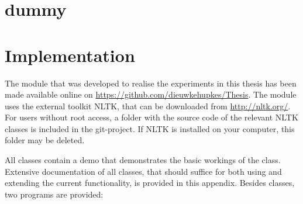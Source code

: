 \documentclass[]{report}
\begin{document}
\appendix
\chapter{dummy}

\chapter{Implementation}

The module that was developed to realise the experiments in this thesis has been made available online on \url{https://github.com/dieuwkehupkes/Thesis}. The module uses the external toolkit NLTK, that can be downloaded from \url{http://nltk.org/}. For users without root access, a folder with the source code of the relevant NLTK classes is included in the git-project. If NLTK is installed on your computer, this folder may be deleted.

All classes contain a demo that demonstrates the basic workings of the class. Extensive documentation of all classes, that should suffice for both using and extending the current functionality, is provided in this appendix. Besides classes, two programs are provided: 


\end{document}
